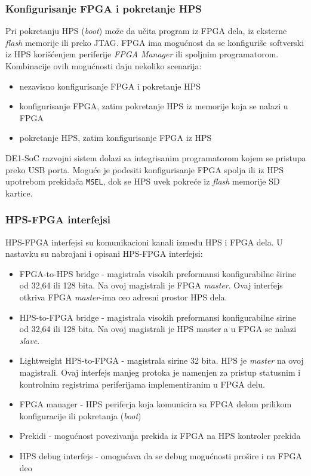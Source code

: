 \subsubsection{Konfigurisanje FPGA i pokretanje HPS}
Pri pokretanju HPS (\textit{boot}) može da učita program iz FPGA dela, iz eksterne \textit{flash} memorije ili preko JTAG. FPGA ima mogućnost da se konfiguriše softverski iz HPS korišćenjem periferije \textit{FPGA Manager} ili spoljnim programatorom. Kombinacije ovih mogućnosti daju nekoliko scenarija:
\begin{itemize}
\item nezavisno konfigurisanje FPGA i pokretanje HPS
\item konfigurisanje FPGA, zatim pokretanje HPS iz memorije koja se nalazi u FPGA
\item pokretanje HPS, zatim konfigurisanje FPGA iz HPS
\end{itemize}
DE1-SoC razvojni sistem dolazi sa integrisanim programatorom kojem se pristupa preko USB porta. Moguće je podesiti konfigurisanje FPGA spolja ili iz HPS upotrebom prekidača \texttt{MSEL}, dok se HPS uvek pokreće iz \textit{flash} memorije SD kartice.

\subsubsection{HPS-FPGA interfejsi}
HPS-FPGA interfejsi su komunikacioni kanali između HPS i FPGA dela. U nastavku su nabrojani i opisani HPS-FPGA interfejsi:
\begin{itemize}
\item  FPGA-to-HPS bridge - magistrala visokih preformansi konfigurabilne širine od 32,64 ili 128 bita. Na ovoj magistrali je FPGA \textit{master}. Ovaj interfejs otkriva FPGA \textit{master}-ima ceo adresni prostor HPS dela.
\item HPS-to-FPGA bridge - magistrala visokih preformansi konfigurabilne sirine od 32,64 ili 128 bita. Na ovoj magistrali je HPS master a u FPGA se nalazi \textit{slave}.
\item Lightweight HPS-to-FPGA - magistrala sirine 32 bita. HPS je \textit{master} na ovoj magistrali. Ovaj interfejs manjeg protoka je namenjen za pristup statusnim i kontrolnim registrima periferijama implementiranim u FPGA delu.
\item FPGA manager - HPS periferja koja komunicira sa FPGA delom prilikom konfiguracije ili pokretanja (\textit{boot})
\item Prekidi - mogućnost povezivanja prekida iz FPGA na HPS kontroler prekida
\item HPS debug interfejs - omogućava da se debug mogućnosti prošire i na FPGA deo
\end{itemize}

